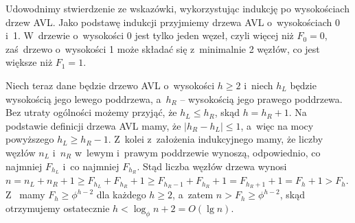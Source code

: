 
\subproblem %
Udowodnimy stwierdzenie ze wskazówki, wykorzystując indukcję po wysokościach drzew AVL.
Jako podstawę indukcji przyjmiemy drzewa AVL o~wysokościach 0 i~1.
W~drzewie o~wysokości 0 jest tylko jeden węzeł, czyli więcej niż $F_0=0$, zaś~drzewo o~wysokości 1 może składać się z~minimalnie 2 węzłów, co jest większe niż $F_1=1$.

Niech teraz dane będzie drzewo AVL o~wysokości $h\ge2$ i~niech $h_L$ będzie wysokością jego lewego poddrzewa, a~$h_R$ -- wysokością jego prawego poddrzewa.
Bez utraty ogólności możemy przyjąć, że $h_L\le h_R$, skąd $h=h_R+1$.
Na podstawie definicji drzewa AVL mamy, że $|h_R-h_L|\le1$, a~więc na mocy powyższego $h_L\ge h_R-1$.
Z~kolei z~założenia indukcyjnego mamy, że liczby węzłów $n_L$ i~$n_R$ w~lewym i~prawym poddrzewie wynoszą, odpowiednio, co najmniej $F_{h_L}$ i~co najmniej $F_{h_R}$.
Stąd liczba węzłów drzewa wynosi $n=n_L+n_R+1\ge F_{h_L}+F_{h_R}+1\ge F_{h_R-1}+F_{h_R}+1=F_{h_R+1}+1=F_h+1>F_h$.
Z~ mamy $F_h\ge\phi^{h-2}$ dla każdego $h\ge2$, a~zatem $n>F_h\ge\phi^{h-2}$, skąd otrzymujemy ostatecznie $h<\log_\phi n+2=O(\lg n)$.

\subproblem %
\subproblem %
\subproblem %
